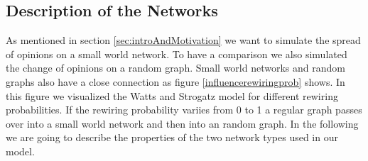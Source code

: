 \subsection{Description of the Networks}
\label{subsec:descriptionofnetwork}
As mentioned in section \ref{sec:introAndMotivation} we want to simulate the spread of opinions on a small world network. To have a comparison we also simulated the change of opinions on a random graph. Small world networks and random graphs also have a close connection as figure \ref{influencerewiringprob} shows. In this figure we visualized the Watts and Strogatz model for different rewiring probabilities. If the rewiring probability variies from 0 to 1 a regular graph passes over into a small world network and then into an random graph. In the following we are going to describe the properties of the two network types used in our model.

